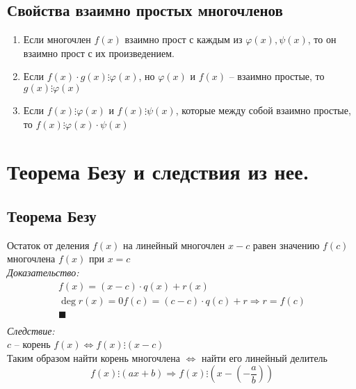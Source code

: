 \documentclass[12pt, fleqn]{article}
\begin{document}
\subsection*{Свойства взаимно простых многочленов} 
\begin{enumerate}
	\item Если многочлен $f(x)$ взаимно прост с каждым из $\varphi(x), \psi(x)$, то он взаимно прост с их произведением.
	\item Если $f(x)\cdot g(x) \vdots \varphi(x)$, но $\varphi(x)$ и $f(x)$ -- взаимно простые, то $g(x) \vdots\varphi(x)$
	\item Если $f(x)\vdots\varphi(x)$ и $f(x)\vdots\psi(x)$, которые между собой взаимно простые, то $f(x)\vdots\varphi(x)\cdot\psi(x)$
\end{enumerate}
\section{Теорема Безу и следствия из нее.}
\subsection*{Теорема Безу}
Остаток от деления $f(x)$ на линейный многочлен $x-c$ равен значению $f(c)$ многочлена $f(x)$ при $x=c$\\
\textit{Доказательство:}\\
\begin{multline*}
	f(x) = (x-c)\cdot q(x)+r(x)\\
	\deg r(x)=0
	f(c) = (c-c)\cdot q(c)+r \Rightarrow \boxed{r=f(c)}\\
	\blacksquare\\
\end{multline*}
\textit{Следствие:}\\
$c$ -- корень $f(x) \Leftrightarrow f(x)\vdots(x-c)$\\
Таким образом найти корень многочлена $\Leftrightarrow$ найти его линейный делитель
$$f(x)\vdots(ax+b)\Rightarrow f(x)\vdots\left(x-\left(-\frac{a}{b}\right)\right)$$
\end{document}
